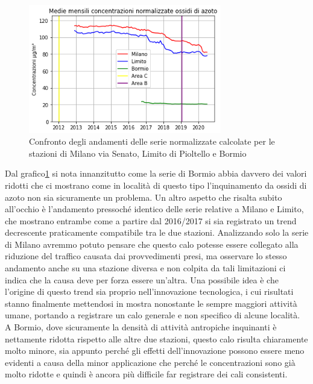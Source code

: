 \begin{figure}[h]
\centering
\includegraphics[width=0.75\textwidth]{nox_traffico}
\caption{Confronto degli andamenti delle serie normalizzate calcolate per le stazioni di Milano via Senato, Limito di Pioltello e Bormio}
\label{fig:nox_traffico}
\end{figure}

Dal grafico\ref{fig:nox_traffico} si nota innanzitutto come la serie di Bormio abbia davvero dei valori ridotti che ci mostrano come in località di questo tipo l'inquinamento da ossidi di azoto non sia sicuramente un problema.
Un altro aspetto che risalta subito all'occhio è l'andamento pressoché identico delle serie relative a Milano e Limito, che mostrano entrambe come a partire dal 2016/2017 si sia registrato un trend decrescente praticamente compatibile tra le due stazioni. Analizzando solo la serie di Milano avremmo potuto pensare che questo calo potesse essere collegato alla riduzione del traffico causata dai provvedimenti presi, ma osservare lo stesso andamento anche su una stazione diversa e non colpita da tali limitazioni ci indica che la causa deve per forza essere un'altra. Una possibile idea è che l'origine di questo trend sia proprio nell'innovazione tecnologica, i cui risultati stanno finalmente mettendosi in mostra nonostante le sempre maggiori attività umane, portando a registrare un calo generale e non specifico di alcune località. A Bormio, dove sicuramente la densità di attività antropiche inquinanti è nettamente ridotta rispetto alle altre due stazioni, questo calo risulta chiaramente molto minore, sia appunto perché gli effetti dell'innovazione possono essere meno evidenti a causa della minor applicazione che perché le concentrazioni sono già molto ridotte e quindi è ancora più difficile far registrare dei cali consistenti.


